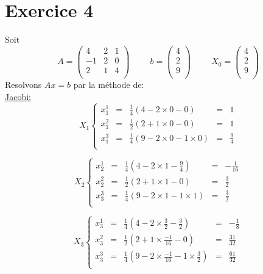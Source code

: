 \documentclass[a4paper,12pt]{article}
\begin{document}
\section{Exercice 4}
Soit 
$$A =\left(
\begin{array}{ccc}
 4&2&1\\
 -1&2&0\\
 2&1&4\\
\end{array}
\right)
\hspace{1cm}
b=\left(
\begin{array}{c}
 4\\
 2\\
 9\\
\end{array}
\right)
\hspace{1cm}
X_0 = \left(
\begin{array}{c}
 4\\
 2\\
 9\\
\end{array}
\right)
$$
Resolvons $Ax=b$ par la m\'ethode de:\\\underline{Jacobi:}
$$
X_1 \left\{
\begin{array}{ccccc}
 x_1^1 & = & \frac{1}{4}(4-2\times0 - 0 )& = &1 \\
 x_1^2 & = & \frac{1}{2}(2+1\times0 - 0 )& = &1 \\
 x_1^3 & = & \frac{1}{4}(9-2\times0 -1\times 0 )& =& \frac{9}{4} \\
\end{array}
\right.
$$

\[
X_2 \left\{
\begin{array}{ccccc}
 x_2^1 & = & \frac{1}{4}(4-2\times1 -\frac{9}{4} )& = &-\frac{1}{16} \\
 x_2^2 & = & \frac{1}{2}(2+1\times1 - 0 )& = &\frac{3}{2} \\
 x_3^3 & = & \frac{1}{4}(9-2\times1 -1\times 1 )& =& \frac{3}{2} \\
\end{array}
\right.
\]

$$
X_3 \left\{
\begin{array}{ccccc}
 x_3^1 & = & \frac{1}{4}(4-2\times\frac{3}{2} - \frac{3}{2} )& = &-\frac{1}{8} \\
 x_3^2 & = & \frac{1}{2}(2+1\times\frac{-1}{16} - 0 )& = &\frac{31}{32} \\
 x_3^3 & = & \frac{1}{4}(9-2\times\frac{-1}{16} -1\times\frac{3}{2} )& =& \frac{61}{32} \\
\end{array}
\right.
$$
\end{document}
